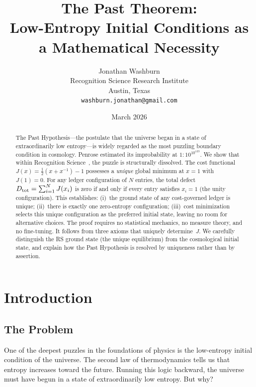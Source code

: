 \documentclass[12pt,a4paper]{article}
\title{The Past Theorem:\\
Low-Entropy Initial Conditions as a Mathematical Necessity}
\author{Jonathan Washburn\\
Recognition Science Research Institute\\
Austin, Texas\\
\texttt{washburn.jonathan@gmail.com}}
\date{March 2026}
\theoremstyle{definition}
\theoremstyle{remark}
\begin{document}
\maketitle

\begin{abstract}
The Past Hypothesis---the postulate that the universe began in a state
of extraordinarily low entropy---is widely regarded as the most puzzling
boundary condition in cosmology.  Penrose estimated its improbability at
$1:10^{10^{123}}$.  We show that within Recognition Science~\cite{RS_Axioms},
the puzzle is structurally dissolved.  The cost functional
$J(x) = \tfrac{1}{2}(x + x^{-1}) - 1$ possesses a \emph{unique} global
minimum at $x = 1$ with $J(1) = 0$.  For any ledger configuration of
$N$ entries, the total defect $D_{\rm tot} = \sum_{i=1}^N J(x_i)$ is
zero if and only if every entry satisfies $x_i = 1$ (the unity
configuration).  This establishes: (i)~the ground state of any
cost-governed ledger is unique; (ii)~there is exactly one zero-entropy
configuration; (iii)~cost minimization selects this unique configuration
as the preferred initial state, leaving no room for alternative choices.
The proof requires no statistical mechanics, no measure theory, and no
fine-tuning.  It follows from three axioms that uniquely determine~$J$.
We carefully distinguish the RS ground state (the unique equilibrium)
from the cosmological initial state, and explain how the Past Hypothesis
is resolved by uniqueness rather than by assertion.
\end{abstract}

\section{Introduction}
\label{sec:intro}

\subsection{The Problem}

One of the deepest puzzles in the foundations of physics is the
low-entropy initial condition of the universe.  The second law of
thermodynamics tells us that entropy increases toward the future.  Running
this logic backward, the universe must have begun in a state of
extraordinarily low entropy.  But why?
\end{document}
